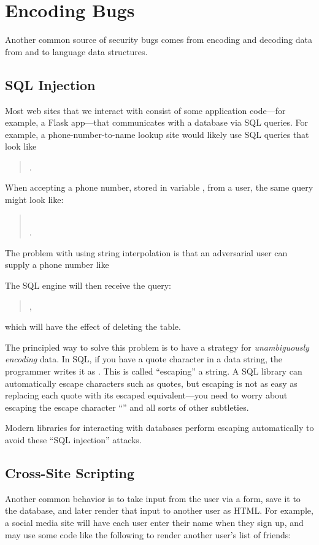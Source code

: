 \section{Encoding Bugs}
Another common source of security bugs comes from encoding and decoding data from and to language data structures.

\subsection{SQL Injection}
Most web sites that we interact with consist of some application code---for
example, a Flask app---that communicates with a database via SQL queries. For
example, a phone-number-to-name lookup site would likely use SQL queries that
look like 
\begin{quote}
	.
\end{quote}
When accepting a phone number, stored in variable , from a user,
the same query might look like:
\begin{quote}
	\\
	.
\end{quote}
The problem with using string interpolation is that an adversarial user
can supply a phone number like
\begin{quote}
\end{quote}
The SQL engine will then receive the query:
\begin{quote}
	,
\end{quote}
which will have the effect of deleting the  table.

The principled way to solve this problem is to have a strategy for
\emph{unambiguously encoding} data.
In SQL, if you have a quote character  in a data string, the programmer
writes it as \ttt{\"}. This is called ``escaping'' a string.
A SQL library can automatically escape characters such as quotes,
but escaping is not as easy as replacing each quote with its escaped
equivalent---you need to worry about escaping the escape character ``\ttt{\\}''
and all sorts of other subtleties.

Modern libraries for interacting with databases perform escaping
automatically to avoid these ``SQL injection'' attacks.


\subsection{Cross-Site Scripting}
Another common behavior is to take input from the user via a form, save it to the database, and later render that input to another user as HTML. For example, a social media site will have each user enter their name when they sign up, and may use some code like the following to render another user's list of friends:

